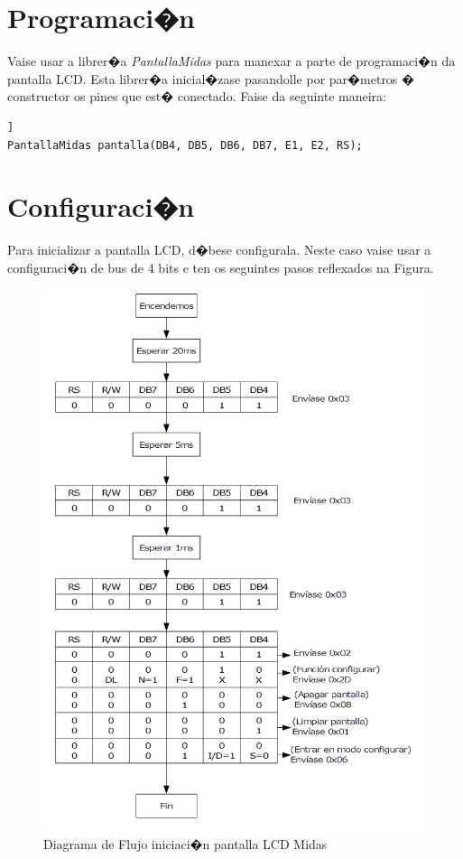 \documentclass[11pt,twoside]{book}
\begin{document}
\section{Programaci�n}

Vaise usar a librer�a \textit{PantallaMidas} para manexar a parte de programaci�n da pantalla LCD. Esta librer�a inicial�zase pasandolle por par�metros � constructor os pines que est� conectado. Faise da seguinte maneira:

\begin{lstlisting}] 
PantallaMidas pantalla(DB4, DB5, DB6, DB7, E1, E2, RS);
\end{lstlisting}


\section{Configuraci�n}

Para inicializar a pantalla LCD, d�bese configurala. Neste caso vaise usar a configuraci�n de bus de 4 bits e ten os seguintes pasos reflexados na Figura.

\begin{figure}[H]
	\begin{center}
		\includegraphics[scale=0.6]{images/inicializar_lcd.png}
	\end{center}
	\caption{Diagrama de Flujo iniciaci�n pantalla LCD Midas}
	\label{fig:DiagramaFlujoPantalla}
\end{figure}
\end{document}
